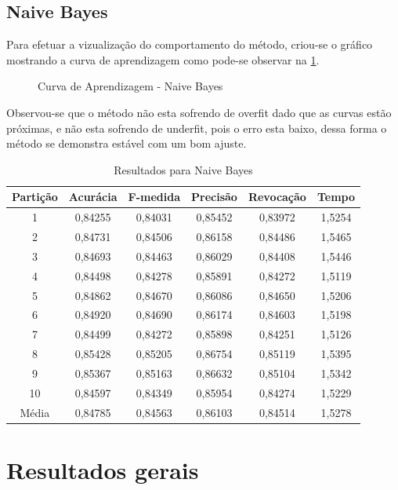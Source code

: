 \subsection{Naive Bayes}
	
Para efetuar a vizualização do comportamento do método, criou-se o gráfico mostrando a curva de aprendizagem como pode-se observar na \ref{fig:NaiveBayes}.

\begin{figure}[h]
	\centering
{}
\caption{Curva de Aprendizagem - Naive Bayes}
\label{fig:NaiveBayes}
\end{figure}

Observou-se que o método não esta sofrendo de overfit dado que as curvas estão próximas, e não esta sofrendo de underfit, pois o erro esta baixo, dessa forma o método se demonstra estável com um bom ajuste. 


\begin{table}[h]
\centering
\caption{Resultados para Naive Bayes}
\vspace{0.2cm}
\begin{tabular}{c|c|c|c|c|c}
Partição & Acurácia & F-medida & Precisão & Revocação & Tempo \\
\hline
1  & 0,84255 & 0,84031 & 0,85452 & 0,83972 & 1,5254 \\
2  & 0,84731 & 0,84506 & 0,86158 & 0,84486 & 1,5465 \\
3  & 0,84693 & 0,84463 & 0,86029 & 0,84408 & 1,5446 \\
4  & 0,84498 & 0,84278 & 0,85891 & 0,84272 & 1,5119 \\
5  & 0,84862 & 0,84670 & 0,86086 & 0,84650 & 1,5206 \\
6  & 0,84920 & 0,84690 & 0,86174 & 0,84603 & 1,5198 \\
7  & 0,84499 & 0,84272 & 0,85898 & 0,84251 & 1,5126 \\
8  & 0,85428 & 0,85205 & 0,86754 & 0,85119 & 1,5395 \\
9  & 0,85367 & 0,85163 & 0,86632 & 0,85104 & 1,5342 \\
10 & 0,84597 & 0,84349 & 0,85954 & 0,84274 & 1,5229 \\
\hline
Média & 0,84785 & 0,84563 & 0,86103 & 0,84514 & 1,5278 \\

\end{tabular} 
\label{table:resultadosNB}
\end{table}

\section{Resultados gerais}

